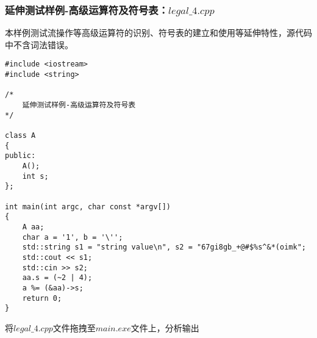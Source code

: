 \documentclass[UTF8]{ctexart}
\begin{document}
\subsubsection{延伸测试样例-高级运算符及符号表：$legal\_4.cpp$}
本样例测试流操作等高级运算符的识别、符号表的建立和使用等延伸特性，源代码中不含词法错误。
\begin{lstlisting}
#include <iostream>
#include <string>

/*
    延伸测试样例-高级运算符及符号表
*/

class A
{
public:
    A();
    int s;
};

int main(int argc, char const *argv[])
{
    A aa;
    char a = '1', b = '\'';
    std::string s1 = "string value\n", s2 = "67gi8gb_+@#$%s^&*(oimk";
    std::cout << s1;
    std::cin >> s2;
    aa.s = (~2 | 4);
    a %= (&aa)->s;
    return 0;
}
\end{lstlisting}
将$legal\_4.cpp$文件拖拽至$main.exe$文件上，分析输出
\end{document}
